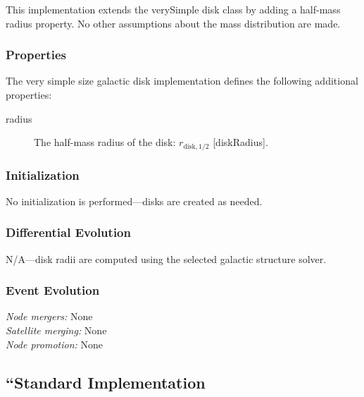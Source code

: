 This implementation extends the {\normalfont \ttfamily verySimple} disk class by adding a half-mass radius property. No other assumptions about the mass distribution are made.

\subsubsection{Properties}

The very simple size galactic disk implementation defines the following additional properties:
\begin{description}
 \item [{\normalfont \ttfamily radius}] The half-mass radius of the disk: $r_\mathrm{disk, 1/2}$ [{\normalfont \ttfamily diskRadius}].
\end{description}

\subsubsection{Initialization}

No initialization is performed---disks are created as needed.

\subsubsection{Differential Evolution}

N/A---disk radii are computed using the selected galactic structure solver.

\subsubsection{Event Evolution}

\noindent\emph{Node mergers:} None\\

\noindent\emph{Satellite merging:} None\\

\noindent\emph{Node promotion:} None\\

\subsection{``Standard Implementation}\label{sec:DiskStandard}

